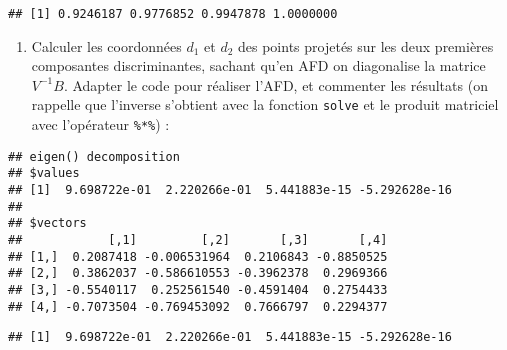 \documentclass[
]{article}
\newenvironment{Shaded}{\begin{snugshade}}{\end{snugshade}}
\newcommand{\CommentTok}[1]{\textcolor[rgb]{0.56,0.35,0.01}{\textit{#1}}}
\newcommand{\DataTypeTok}[1]{\textcolor[rgb]{0.13,0.29,0.53}{#1}}
\newcommand{\DecValTok}[1]{\textcolor[rgb]{0.00,0.00,0.81}{#1}}
\newcommand{\KeywordTok}[1]{\textcolor[rgb]{0.13,0.29,0.53}{\textbf{#1}}}
\newcommand{\NormalTok}[1]{#1}
\newcommand{\OperatorTok}[1]{\textcolor[rgb]{0.81,0.36,0.00}{\textbf{#1}}}
\newcommand{\StringTok}[1]{\textcolor[rgb]{0.31,0.60,0.02}{#1}}
\providecommand{\tightlist}{%
  \setlength{\itemsep}{0pt}\setlength{\parskip}{0pt}}
\begin{document}
\begin{verbatim}
## [1] 0.9246187 0.9776852 0.9947878 1.0000000
\end{verbatim}

\begin{enumerate}
\def\labelenumi{\arabic{enumi}.}
\setcounter{enumi}{18}
\tightlist
\item
  Calculer les coordonnées \(d_1\) et \(d_2\) des points projetés sur
  les deux premières composantes discriminantes, sachant qu'en AFD on
  diagonalise la matrice \(V^{-1}B\). Adapter le code pour réaliser
  l'AFD, et commenter les résultats (on rappelle que l'inverse s'obtient
  avec la fonction \texttt{solve} et le produit matriciel avec
  l'opérateur \texttt{\%*\%}) :
\end{enumerate}

\begin{Shaded}
\end{Shaded}

\begin{verbatim}
## eigen() decomposition
## $values
## [1]  9.698722e-01  2.220266e-01  5.441883e-15 -5.292628e-16
## 
## $vectors
##            [,1]         [,2]       [,3]       [,4]
## [1,]  0.2087418 -0.006531964  0.2106843 -0.8850525
## [2,]  0.3862037 -0.586610553 -0.3962378  0.2969366
## [3,] -0.5540117  0.252561540 -0.4591404  0.2754433
## [4,] -0.7073504 -0.769453092  0.7666797  0.2294377
\end{verbatim}

\begin{Shaded}
\end{Shaded}

\begin{verbatim}
## [1]  9.698722e-01  2.220266e-01  5.441883e-15 -5.292628e-16
\end{verbatim}

\begin{Shaded}
\end{Shaded}
\end{document}
